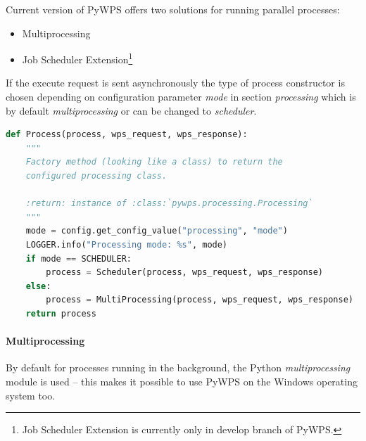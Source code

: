 \documentclass[12pt,a4paper]{article}
\begin{document}
Current version of PyWPS offers two solutions for running parallel processes:
\begin{itemize}
\item Multiprocessing
\item Job Scheduler Extension\footnote{Job Scheduler Extension is currently only in develop branch of PyWPS.}
\end{itemize}

If the execute request is sent asynchronously the type of process constructor is chosen depending on configuration
parameter \textit{mode} in section \textit{processing} which is by default \textit{multiprocessing} or can be changed 
to \textit{scheduler}.

\bigskip
\begin{lstlisting}[basicstyle=\small,caption={processing.\_\_init\_\_.py},label={lst:Process_init},language=python]
def Process(process, wps_request, wps_response):
    """
    Factory method (looking like a class) to return the
    configured processing class.

    :return: instance of :class:`pywps.processing.Processing`
    """
    mode = config.get_config_value("processing", "mode")
    LOGGER.info("Processing mode: %s", mode)
    if mode == SCHEDULER:
        process = Scheduler(process, wps_request, wps_response)
    else:
        process = MultiProcessing(process, wps_request, wps_response)
    return process
\end{lstlisting}
\bigskip
\bigskip

\paragraph{Multiprocessing}
By default for  processes   running   in   the   background,   the   Python \textit{multiprocessing} module is used – 
this makes it possible to use PyWPS on the Windows operating system too.
\end{document}
